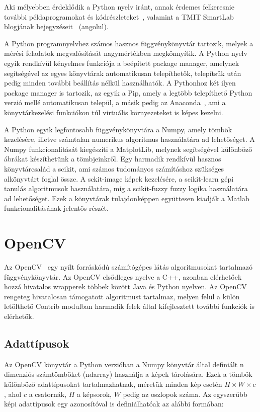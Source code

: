 \documentclass[12pt,a4paper,oneside]{report}             %
\begin{document}
Aki mélyebben érdeklődik a Python nyelv iránt, annak érdemes felkeresnie további példaprogramokat és kódrészleteket~\cite{gist}, valamint a TMIT SmartLab blogjának bejegyzéseit~\cite{smart1,smart2} (angolul). 

A Python programnyelvhez számos hasznos függvénykönyvtár tartozik, melyek a mérési feladatok megvalósítását nagymértékben megkönnyítik. A Python nyelv egyik rendkívül kényelmes funkciója a beépített package manager, amelynek segítségével az egyes könyvtárak automatikusan telepíthetők, telepítsük után pedig minden további beállítás nélkül használhatók. A Pythonhoz két ilyen package manager is tartozik, az egyik a Pip, amely a legtöbb telepíthető Python verzió mellé automatikusan települ, a másik pedig az Anaconda~\cite{conda}, ami a könyvtárkezelési funkciókon túl virtuális környezeteket is képes kezelni.

A Python egyik legfontosabb függvénykönyvtára a Numpy, amely tömbök kezelésére, illetve számtalan numerikus algoritmus használatára ad lehetőséget. A Numpy funkcionalitását kiegészíti a MatplotLib, melynek segítségével különböző ábrákat készíthetünk a tömbjeinkről. Egy harmadik rendkívül hasznos könyvtárcsalád a scikit, ami számos tudományos számításhoz szükséges alkönyvtárt foglal össze. A sckit-image képek kezelésére, a scikit-learn gépi tanulás algoritmusok használatára, míg a scikit-fuzzy fuzzy logika használatára ad lehetőséget. Ezek a könyvtárak tulajdonképpen együttesen kiadják a Matlab funkcionalitásának jelentős részét.

\section{OpenCV}

Az OpenCV~\cite{opencv} egy nyílt forráskódú számítógépes látás algoritmusokat tartalmazó függvénykönyvtár. Az OpenCV elsődleges nyelve a C++, azonban elérhetőek hozzá hivatalos wrapperek többek között Java és Python nyelven. Az OpenCV rengeteg hivatalosan támogatott algoritmust tartalmaz, melyen felül a külön letölthető Contrib modulban harmadik felek által kifejlesztett további funkciók is elérhetők.

\subsection{Adattípusok}

Az OpenCV könyvtár a Python verzióban a Numpy könyvtár által definiált n dimenziós számtömböket (ndarray) használja a képek tárolására. Ezek a tömbök különböző adattípusokat tartalmazhatnak, méretük minden kép esetén $H\times W\times c$, ahol $c$ a csatornák, $H$ a képsorok, $W$ pedig az oszlopok száma. Az egyszerűbb képi adattípusok egy azonosítóval is definiálhatóak az alábbi formában:
\end{document}
